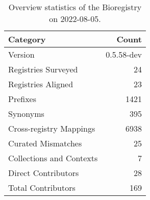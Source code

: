 \begin{table}
\centering
\caption{Overview statistics of the Bioregistry on 2022-08-05.}
\label{tab:bioregistry-summary}
\begin{tabular}{lr}
\toprule
                Category &      Count \\
\midrule
                 Version & 0.5.58-dev \\
     Registries Surveyed &         24 \\
      Registries Aligned &         23 \\
                Prefixes &       1421 \\
                Synonyms &        395 \\
 Cross-registry Mappings &       6938 \\
      Curated Mismatches &         25 \\
Collections and Contexts &          7 \\
     Direct Contributors &         28 \\
      Total Contributors &        169 \\
\bottomrule
\end{tabular}
\end{table}
